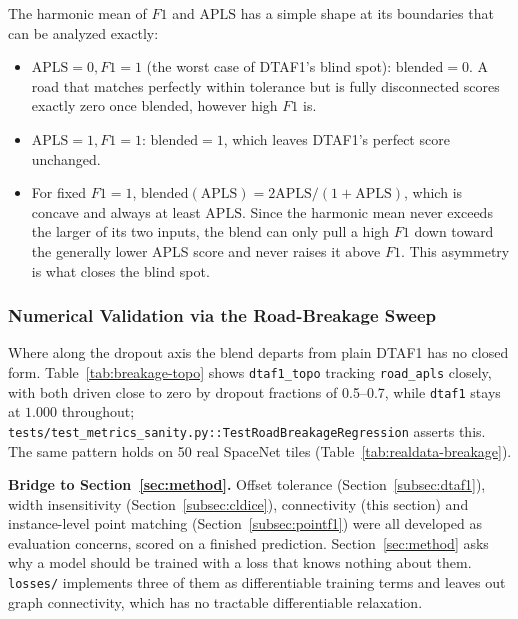 The harmonic mean of $F1$ and $\mathrm{APLS}$ has a simple shape at its boundaries that can be
analyzed exactly:
\begin{itemize}
  \item $\mathrm{APLS}=0, F1=1$ (the worst case of DTAF1's blind spot): $\mathrm{blended}=0$. A road
    that matches perfectly within tolerance but is fully disconnected scores exactly zero once
    blended, however high $F1$ is.
  \item $\mathrm{APLS}=1, F1=1$: $\mathrm{blended}=1$, which leaves DTAF1's perfect score
    unchanged.
  \item For fixed $F1=1$, $\mathrm{blended}(\mathrm{APLS}) = 2\mathrm{APLS}/(1+\mathrm{APLS})$,
    which is concave and always at least $\mathrm{APLS}$. Since the harmonic mean never exceeds
    the larger of its two inputs, the blend can only pull a high $F1$ down toward the generally
    lower APLS score and never raises it above $F1$. This asymmetry is what closes the blind spot.
\end{itemize}

\subsubsection{Numerical Validation via the Road-Breakage Sweep}

Where along the dropout axis the blend departs from plain DTAF1 has no closed form.
Table~\ref{tab:breakage-topo} shows \texttt{dtaf1\_topo} tracking \texttt{road\_apls} closely, with
both driven close to zero by dropout fractions of 0.5--0.7, while \texttt{dtaf1} stays at $1.000$
throughout; \texttt{tests/test\_metrics\_sanity.py::\allowbreak{}TestRoadBreakageRegression} asserts
this. The same pattern holds on 50 real SpaceNet tiles (Table~\ref{tab:realdata-breakage}).

\noindent\textbf{Bridge to Section~\ref{sec:method}.} Offset tolerance (Section~\ref{subsec:dtaf1}),
width insensitivity (Section~\ref{subsec:cldice}), connectivity (this section) and instance-level
point matching (Section~\ref{subsec:pointf1}) were all developed as evaluation concerns, scored on a
finished prediction. Section~\ref{sec:method} asks why a model should be trained with a loss that
knows nothing about them. \texttt{losses/} implements three of them as differentiable training
terms and leaves out graph connectivity, which has no tractable differentiable relaxation.
